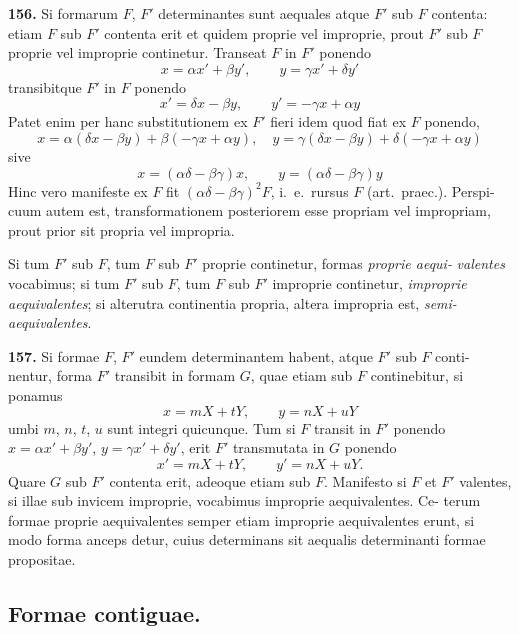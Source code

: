 \documentclass[12pt,a4paper]{article}
\begin{document}
\textbf{156.}
Si formarum $F$, $F'$ determinantes sunt aequales atque $F'$ sub $F$ contenta: etiam
$F$ sub $F'$ contenta erit et quidem proprie vel improprie, prout $F'$ sub $F$ proprie vel
improprie continetur. Transeat $F$ in $F'$ ponendo
\[
x = \alpha x' + \beta y', \qquad y = \gamma x' + \delta y'
\]
transibitque $F'$ in $F$ ponendo
\[
x' = \delta x - \beta y, \qquad y' = -\gamma x + \alpha y
\]
Patet enim per hanc substitutionem ex $F'$ fieri idem quod fiat ex $F$ ponendo,
\[
x = \alpha(\delta x - \beta y) + \beta(-\gamma x + \alpha y), \quad y = \gamma(\delta x - \beta y) + \delta(-\gamma x + \alpha y)
\]
sive
\[
x = (\alpha\delta - \beta\gamma)x, \qquad y = (\alpha\delta - \beta\gamma)y
\]
Hinc vero manifeste ex $F$ fit $(\alpha\delta - \beta\gamma)^2 F$, i.~e.\ rursus $F$ (art.\ praec.). Perspi-
cuum autem est, transformationem posteriorem esse propriam vel impropriam,
prout prior sit propria vel impropria.

Si tum $F'$ sub $F$, tum $F$ sub $F'$ proprie continetur, formas \textit{proprie aequi-}
\textit{valentes} vocabimus; si tum $F'$ sub $F$, tum $F$ sub $F'$ improprie continetur, \textit{improprie}
\textit{aequivalentes}; si alterutra continentia propria, altera impropria est, \textit{semi-aequivalentes}.

\textbf{157.}
Si formae $F$, $F'$ eundem determinantem habent, atque $F'$ sub $F$ conti-
nentur, forma $F'$ transibit in formam $G$, quae etiam sub $F$ continebitur, si
ponamus
\[
x = mX + tY, \qquad y = nX + uY
\]
umbi $m$, $n$, $t$, $u$ sunt integri quicunque. Tum si $F$ transit in $F'$ ponendo
$x = \alpha x' + \beta y'$, $y = \gamma x' + \delta y'$, erit $F'$ transmutata in $G$ ponendo
\[
x' = mX + tY, \qquad y' = nX + uY.
\]
Quare $G$ sub $F'$ contenta erit, adeoque etiam sub $F$. Manifesto si $F$ et $F'$
valentes, si illae sub invicem improprie, vocabimus improprie aequivalentes. Ce-
terum formae proprie aequivalentes semper etiam improprie aequivalentes erunt,
si modo forma anceps detur, cuius determinans sit aequalis determinanti formae
propositae.

\subsection*{Formae contiguae.}
\end{document}
